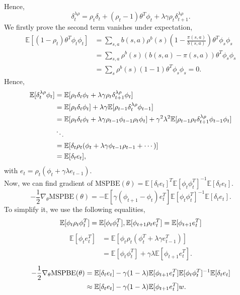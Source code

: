 \documentclass[11pt,a4paper]{article}
\def\E{\mathbb{E}}
\begin{document}
Hence,
\begin{equation}
\delta_t^{\lambda\rho} = \rho_t\delta_t + (\rho_t-1)\theta^T\phi_t + \lambda\gamma\rho_t\delta_{t+1}^{\lambda\rho}.
\end{equation}
We firstly prove the second term vanishes under expectation,
\begin{align}
\E[(1-\rho_t)\theta^T\phi_t\phi_t] & = \sum_{s,a} b(s,a)\rho^b(s)(1-\frac{\pi(s,a)}{b(s,a)})\theta^T\phi_s\phi_s \\ 
& = \sum_{s,a} \rho^b(s)(b(s,a)-\pi(s,a))\theta^T\phi_s\phi_s \\ & = \sum_s \rho^b(s)(1-1)\theta^T\phi_s\phi_s = 0. 
\end{align}
Hence,
\begin{equation}
\aligned
 \E[\delta_t^{\lambda\rho}\phi_t] &= \E[\rho_t\delta_t\phi_t + \lambda\gamma\rho_t\delta_{t+1}^{\lambda\rho}\phi_t] \\ 
& = \E[\rho_t\delta_t\phi_t] + \lambda\gamma\E[\rho_{t-1}\delta_{t}^{\lambda\rho}\phi_{t-1}] \\ 
& = \E[\rho_t\delta_t\phi_t + \lambda\gamma \rho_{t-1}\phi_{t-1}\rho_t\phi_t] + \gamma^2\lambda^2\E[\rho_{t-1}\rho_t\delta_{t+1}^{\lambda\rho}\phi_{t-1}\phi_t] \\ 
& \ddots \\ 
& = \E[\delta_t\rho_t(\phi_t+\lambda\gamma\phi_{t-1}\rho_{t-1}+\cdots)]\\ 
& = \E[\delta_t e_t],
\endaligned 
\end{equation}
with $e_t = \rho_t(\phi_t + \gamma\lambda e_{t-1})$.\\ 
Now, we can find gradient of $\mathrm{MSPBE}(\theta) = \E[\delta_te_t]^T\E[\phi_t\phi_t^T]^{-1}\E[\delta_te_t]$.
\begin{equation}
-\frac{1}{2}\nabla_{\theta}\mathrm{MSPBE}(\theta) = -\E[\gamma(\phi_{t+1}-\phi_t)e_t^T]\E[\phi_t\phi_t^T]^{-1}\E[\delta_te_t].
\end{equation}
To simplify it, we use the following equalities,
\begin{equation}
\aligned
\E[\phi_t\rho_t\phi_t^T] = \E[\phi_t\phi_t^T], \E[\phi_{t+1}\rho_te_t^T] = \E[\phi_{t+1}e_t^T]
\endaligned 
\end{equation}
\begin{align}
\E[\phi_t e_t^T] & = \E[\phi_t\rho_t(\phi_t^T+\lambda\gamma e_{t-1}^T)] \\ 
& = \E[\phi_t\phi_t^T] + \gamma\lambda\E[\phi_{t+1}e_t^T].
\end{align}
\begin{equation}
\aligned 
-\frac{1}{2}\nabla_{\theta}\mathrm{MSPBE}(\theta) & = \E[\delta_t e_t] - \gamma(1-\lambda)\E[\phi_{t+1}e_t^T]\E[\phi_t\phi_t^T]^{-1}\E[\delta_te_t] \\ 
& \approx \E[\delta_t e_t] - \gamma(1-\lambda)\E[\phi_{t+1}e_t^T]w.
\endaligned
\end{equation}
\end{document}
